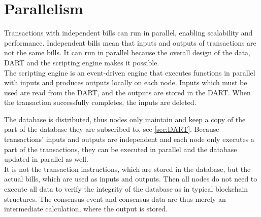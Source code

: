 \section{Parallelism}
Transactions with independent bills can run in parallel, enabling scalability and performance. Independent bills mean that inputs and outputs of transactions are not the same bills. It can run in parallel because the overall design of the data, DART and the scripting engine makes it possible. \\
The scripting engine is an event-driven engine that executes functions in parallel with inputs and produces outputs locally on each node. Inputs which must be used are read from the DART, and the outputs are stored in the DART. When the transaction successfully completes, the inputs are deleted.

The database is distributed, thus nodes only maintain and keep a copy of the part of the database they are subscribed to, see \cref{sec:DART}. Because transactions' inputs and outputs are independent and each node only executes a part of the transactions, they can be executed in parallel and the database updated in parallel as well. \\
It is not the transaction instructions, which are stored in the database, but the actual bills, which are used as inputs and outputs. Then all nodes do not need to execute all data to verify the integrity of the database as in typical blockchain structures. The consensus event and consensus data are thus merely an intermediate calculation, where the output is stored. 
